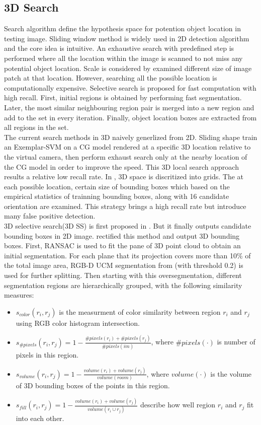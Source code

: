 \documentclass[english]{ccdconf}
\begin{document}
\subsection{3D Search}
Search algorithm define the hypothesis space for potention object location in testing image. Sliding window method is widely used in 2D detection algorithm\cite{dalal2005histograms,felzenszwalb2010object} and the core idea is intuitive.  An exhaustive search with predefined step is performed where all the location within the image is scanned to not miss any potential object location. Scale is considered by examined different size of image patch at that location. However, searching all the possible location is computationally expensive. Selective search is proposed for fast computation with high recall\cite{uijlings2013selective}. First, initial regions is obtained by performing fast segmentation\cite{felzenszwalb2004efficient}. Later, the most similar neighbouring region pair is merged into a new region and add to the set in every iteration. Finally, object location boxes are extracted from all regions in the set.\\
The current search methods in 3D naively generlized from 2D. Sliding shape\cite{song2014sliding} train an Exemplar-SVM on a CG model rendered at a specific 3D location relative to the virtual camera, then perform exhaust search only at the nearby location of the CG model in order to improve the speed. This 3D local search approach results a relative low recall rate. In \cite{ren2016three}, 3D space is discritized into grids. The at each possible location, certain size of bounding boxes which based on the empirical statistics of trainning bounding boxes, along with 16 candidate orientation are examined. This strategy brings a high recall rate but introduce many false positive detection.\\
3D selective search(3D SS) is first  proposed in \cite{kanezaki20153d}. But it finally outputs candidate bounding boxes in 2D image. \cite{song2016deep} rectified this method and output 3D bounding boxes. First, RANSAC is used to fit the pane of 3D point cloud to obtain an initial segmentation. For each plane that its projection covers more than 10\% of the total image area,
RGB-D UCM segmentation from \cite{gupta2014learning}(with threshold 0.2) is used for further splitting. Then starting with this oversegmentation, different segmentation regions are hierarchically grouped, with the following similarity measures:
\begin{itemize}
\item $s_{color}(r_i,r_j)$ is the measurment of color similarity between region $r_i$ and $r_j$ using RGB color histogram intersection.
\item $s_{\#pixels}(r_i,r_j)=1-\frac{\#pixels(r_i)+\#pixels(r_j)}{\#pixels(im)}$, where $\#pixels(\cdot)$ is number of pixels in this region.
\item
$s_{volume}(r_i,r_j)=1-\frac{volume(r_i)+volume(r_j)}{volume(room)}$, where $volume(\cdot)$ is the volume of 3D bounding boxes of the points in this region.
\item
$s_{fill}(r_i,r_j)=1-\frac{volume(r_i)+volume(r_j)}{volume(r_i \cup r_j)}$ describe how well region $r_i$ and $r_j$ fit into each other.
\end{itemize}
\end{document}
